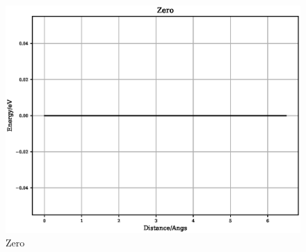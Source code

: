\documentclass[12pt,twoside]{manual}
\begin{document}
\begin{appendices}
\FloatBarrier
\begin{figure}[h]
  \begin{center}
    \includegraphics[scale=0.5]{img/plots/zero.eps}
    \caption{Zero}
    \label{graph:graph1}
  \end{center}
\end{figure}
\FloatBarrier































\end{appendices}








\printbibliography
\end{document}
